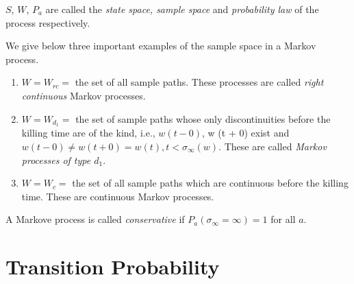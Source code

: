 $S$, $W$, $P_a$ are called the \textit{state space, sample space} and
\textit{probability law} of the process respectively.  

We give below three important examples of the sample space in a Markov process. 
\begin{enumerate}
\renewcommand{\theenumi}{\alph{enumi}}
\renewcommand{\labelenumi}{(\theenumi)}
\item $W= W_{rc} =$ the set of all sample paths. 
These processes are called \textit{right continuous} Markov processes. 

\item $W = W_{d_1}= $ the set of sample paths whose only
  discontinuities before the killing time are of the kind, i.e., $w (t
  - 0)$, w (t + 0) exist and $w (t -0) \neq w (t +0) = w(t) , t <
  \sigma_\infty (w)$. These are called \textit{Markov processes of
    type $d_1$}.  

\item $W = W_c = $ the set of all sample paths which are continuous
  before the killing time. These are continuous Markov processes.  
\end{enumerate}


\begin{rem}\label{chap1-sec1-rem2}%
A Markove process is called {\em conservative } if $P_a
(\sigma_\infty = \infty ) = 1$ for all $a$. 
\end{rem}

\setcounter{section}{2}
\section{Transition Probability}\label{chap1-sec3} 

